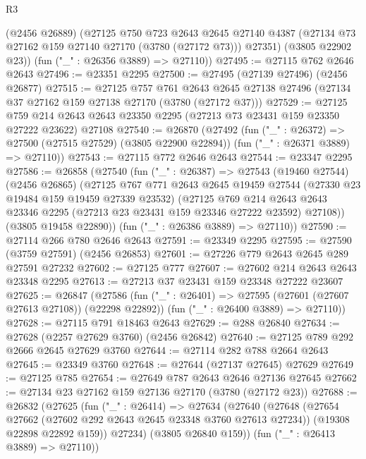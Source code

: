 \begin{lexlean}{R3}
\begin{coremodule}
        (@2456 @26889)
        (@27125
          @750
          @723
          @2643
          @2645
          @27140
          @4387
          (@27134 @73 @27162 @159 @27140 @27170 (@3780 (@27172 @73)))
          @27351)
        (@3805 @22902 @23))
      (fun ("_" : @26356 @3889) => @27110))
@27495 := @27115 @762 @2646 @2643
@27496 := @23351 @2295
@27500 := @27495 (@27139 @27496) (@2456 @26877)
@27515 := @27125
    @757
    @761
    @2643
    @2645
    @27138
    @27496
    (@27134 @37 @27162 @159 @27138 @27170 (@3780 (@27172 @37)))
@27529 := @27125
    @759
    @214
    @2643
    @2643
    @23350
    @2295
    (@27213 @73 @23431 @159 @23350 @27222 @23622)
    @27108
@27540 := @26870
    (@27492
      (fun ("_" : @26372) => @27500 (@27515 @27529) (@3805 @22900 @22894))
      (fun ("_" : @26371 @3889) => @27110))
@27543 := @27115 @772 @2646 @2643
@27544 := @23347 @2295
@27586 := @26858
    (@27540
      (fun ("_" : @26387) =>
      @27543
        (@19460 @27544)
        (@2456 @26865)
        (@27125
          @767
          @771
          @2643
          @2645
          @19459
          @27544
          (@27330 @23 @19484 @159 @19459 @27339 @23532)
          (@27125
            @769
            @214
            @2643
            @2643
            @23346
            @2295
            (@27213 @23 @23431 @159 @23346 @27222 @23592)
            @27108))
        (@3805 @19458 @22890))
      (fun ("_" : @26386 @3889) => @27110))
@27590 := @27114 @266 @780 @2646 @2643
@27591 := @23349 @2295
@27595 := @27590 (@3759 @27591) (@2456 @26853)
@27601 := @27226 @779 @2643 @2645 @289 @27591 @27232
@27602 := @27125 @777
@27607 := @27602 @214 @2643 @2643 @23348 @2295
@27613 := @27213 @37 @23431 @159 @23348 @27222 @23607
@27625 := @26847
    (@27586
      (fun ("_" : @26401) => @27595 (@27601 (@27607 @27613 @27108)) (@22298 @22892))
      (fun ("_" : @26400 @3889) => @27110))
@27628 := @27115 @791 @18463 @2643
@27629 := @288 @26840
@27634 := @27628 (@2257 @27629 @3760) (@2456 @26842)
@27640 := @27125 @789 @292 @2666 @2645 @27629 @3760
@27644 := @27114 @282 @788 @2664 @2643
@27645 := @23349 @3760
@27648 := @27644 (@27137 @27645) @27629
@27649 := @27125 @785
@27654 := @27649 @787 @2643 @2646 @27136 @27645
@27662 := @27134 @23 @27162 @159 @27136 @27170 (@3780 (@27172 @23))
@27688 := @26832
    (@27625
      (fun ("_" : @26414) =>
      @27634
        (@27640
          (@27648
            (@27654 @27662 (@27602 @292 @2643 @2645 @23348 @3760 @27613 @27234))
            (@19308 @22898 @22892 @159))
          @27234)
        (@3805 @26840 @159))
      (fun ("_" : @26413 @3889) => @27110))

\end{coremodule}
\end{lexlean}
